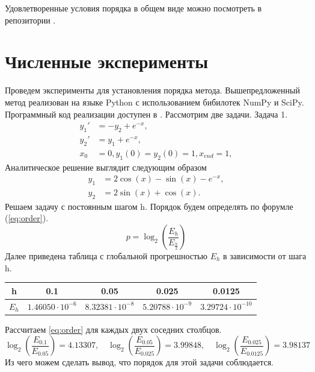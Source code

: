\documentclass[a4paper,article,14pt]{extarticle}
\begin{document}
Удовлетворенные условия порядка в общем виде можно посмотреть в репозитории \cite{code}.
\pagebreak

\section{Численные эксперименты}\label{numeric}
Проведем эксперименты для установления порядка метода. Вышепредложенный метод реализован на языке Python с использованием бибилотек NumPy и SciPy. Программный код реализации доступен в \cite{code}. Рассмотрим две задачи. \newline
Задача 1.
\begin{equation}
\begin{aligned}
    y_{1}' &= -y_{2} + e^{-x}, \\
    y_{2}' &= y_{1} + e^{-x}, \\
    x_{0} &= 0, y_{1}(0) = y_{2}(0) = 1, x_{end} = 1,
\end{aligned}
\end{equation}
Аналитическое решение выглядит следующим образом
\begin{equation}
\begin{aligned}
    y_{1} &= 2 \cos(x) - \sin(x) - e^{-x}, \\
    y_{2} &= 2 \sin(x) + \cos(x).
\end{aligned}
\end{equation}
Решаем задачу с постоянным шагом h. Порядок будем определять по форумле (\ref{eq:order}).
\begin{equation}
p = \log_{2}(\frac{E_{h}}{E_{\frac{h}{2}}})
\label{eq:order}
\end{equation}
Далее приведена таблица с глобальной прогрешностью $E_{h}$ в зависимости от шага h. 
\begin{center}
\begin{tabular}{ |c|c|c|c|c| } 
\hline
h & 0.1& 0.05 & 0.025 & 0.0125 \\ 
\hline
$E_{h}$ & $1.46050\cdot10^{-6}$ & $8.32381\cdot10^{-8}$ & $5.20788\cdot10^{-9}$ & $3.29724\cdot10^{-10}$ \\ 
\hline
\end{tabular}
\end{center}
Рассчитаем \ref{eq:order} для каждых двух соседних столбцов.
\begin{equation}
\log_{2}(\frac{E_{0.1}}{E_{0.05}}) = 4.13307, \quad \log_{2}(\frac{E_{0.05}}{E_{0.025}}) = 3.99848 , \quad \log_{2}(\frac{E_{0.025}}{E_{0.0125}}) = 3.98137
\end{equation}
Из чего можем сделать вывод, что порядок для этой задачи соблюдается. \newline
\end{document}
